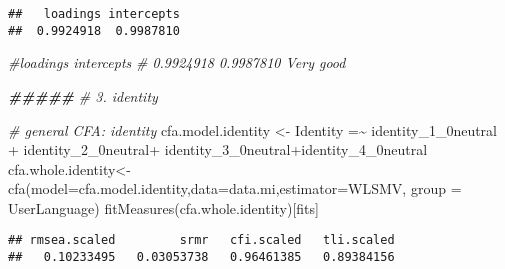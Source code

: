 \documentclass[
]{article}
\newenvironment{Shaded}{\begin{snugshade}}{\end{snugshade}}
\newcommand{\AttributeTok}[1]{\textcolor[rgb]{0.77,0.63,0.00}{#1}}
\newcommand{\CommentTok}[1]{\textcolor[rgb]{0.56,0.35,0.01}{\textit{#1}}}
\newcommand{\DocumentationTok}[1]{\textcolor[rgb]{0.56,0.35,0.01}{\textbf{\textit{#1}}}}
\newcommand{\FloatTok}[1]{\textcolor[rgb]{0.00,0.00,0.81}{#1}}
\newcommand{\FunctionTok}[1]{\textcolor[rgb]{0.00,0.00,0.00}{#1}}
\newcommand{\NormalTok}[1]{#1}
\newcommand{\OtherTok}[1]{\textcolor[rgb]{0.56,0.35,0.01}{#1}}
\newcommand{\SpecialCharTok}[1]{\textcolor[rgb]{0.00,0.00,0.00}{#1}}
\newcommand{\StringTok}[1]{\textcolor[rgb]{0.31,0.60,0.02}{#1}}
\begin{document}
\begin{Shaded}
\end{Shaded}

\begin{verbatim}
##   loadings intercepts 
##  0.9924918  0.9987810
\end{verbatim}

\begin{Shaded}
\begin{Highlighting}[]
\CommentTok{\#loadings intercepts }
\CommentTok{\# 0.9924918  0.9987810   Very good}


\DocumentationTok{\#\#\#\#\#}
\CommentTok{\# 3. identity}


\CommentTok{\# general CFA: identity}
\NormalTok{cfa.model.identity }\OtherTok{\textless{}{-}} \StringTok{\textquotesingle{}Identity =\textasciitilde{} identity\_1\_0neutral + identity\_2\_0neutral+}
\StringTok{  identity\_3\_0neutral+identity\_4\_0neutral\textquotesingle{}}
\NormalTok{cfa.whole.identity}\OtherTok{\textless{}{-}} \FunctionTok{cfa}\NormalTok{(}\AttributeTok{model=}\NormalTok{cfa.model.identity,}\AttributeTok{data=}\NormalTok{data.mi,}\AttributeTok{estimator=}\StringTok{\textquotesingle{}WLSMV\textquotesingle{}}\NormalTok{, }\AttributeTok{group =} 
                       \StringTok{\textquotesingle{}UserLanguage\textquotesingle{}}\NormalTok{)}
\FunctionTok{fitMeasures}\NormalTok{(cfa.whole.identity)[fits]}
\end{Highlighting}
\end{Shaded}

\begin{verbatim}
## rmsea.scaled         srmr   cfi.scaled   tli.scaled 
##   0.10233495   0.03053738   0.96461385   0.89384156
\end{verbatim}
\end{document}

